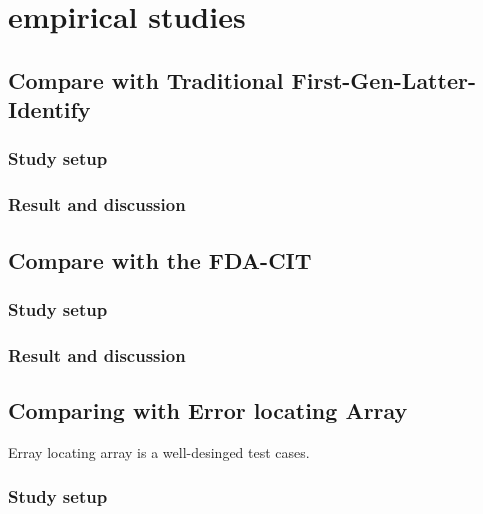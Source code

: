 \documentclass{sig-alternate}
\begin{document}
%
%

\section{empirical studies}

\subsection{Compare with Traditional First-Gen-Latter-Identify}

\subsubsection{Study setup}

\subsubsection{Result and discussion}

\subsection{Compare with the FDA-CIT}

\subsubsection{Study setup}


\subsubsection{Result and discussion}


\subsection{Comparing with Error locating Array}
Erray locating array is a well-desinged test cases.
\subsubsection{Study setup}


\end{document}
